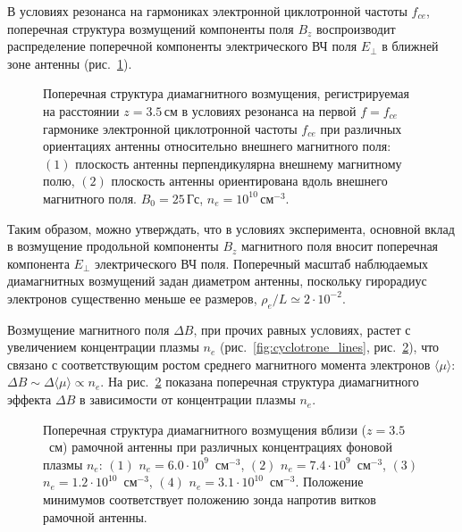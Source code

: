 \documentclass[autoref,10pt]{disser}
\begin{document}
В условиях резонанса на гармониках электронной циклотронной частоты $f_{ce}$, поперечная структура возмущений компоненты поля $B_{z}$  воспроизводит распределение поперечной компоненты электрического ВЧ поля $E_{\perp}$ в ближней зоне антенны (\mbox{рис.~\ref{fig:tr+par_distr}}).
\begin{figure}[H]
    \centering
    \def\svgwidth{0.6\columnwidth} %
    
    \caption{Поперечная структура диамагнитного возмущения, регистрируемая на расстоянии $z=3.5$\,см в условиях резонанса на первой $f=f_{ce}$ гармонике электронной циклотронной частоты $f_{ce}$ при различных ориентациях антенны относительно внешнего магнитного поля: $(1)$ плоскость антенны перпендикулярна внешнему магнитному полю, $(2)$ плоскость антенны ориентирована вдоль внешнего магнитного поля. $B_{0}=25$\,Гс, $n_{e}=10^{10}$\,см$^{-3}$.}
    \label{fig:tr+par_distr}
\end{figure}

Таким образом, можно утверждать, что в условиях эксперимента, основной вклад в возмущение продольной компоненты  $B_{z}$ магнитного поля вносит поперечная компонента $E_{\perp}$ электрического ВЧ поля. Поперечный масштаб наблюдаемых диамагнитных возмущений задан диаметром антенны, поскольку гирорадиус электронов существенно меньше ее размеров, $\rho_e/L \simeq2\cdot 10^{-2}$. 

Возмущение магнитного поля $\Delta{}B$, при прочих равных условиях, растет с увеличением концентрации плазмы $n_{e}$ (\mbox{рис.~\ref{fig:cyclotrone_lines}}, \mbox{рис.~\ref{fig:ne_distr}}), что связано с соответствующим ростом среднего магнитного момента электронов $\langle{}\mu{}\rangle$: $\Delta{}B\sim{}\Delta{}\langle{}\mu{}\rangle{}\propto{}n_{e}$.
На \mbox{рис.~\ref{fig:ne_distr}} показана поперечная структура диамагнитного эффекта $\Delta{}B$ в зависимости от концентрации плазмы $n_{e}$. 
\begin{figure}[H]
   \centering
   \def\svgwidth{0.5\columnwidth} %
   
   \vspace{0.5cm}
   \caption{Поперечная структура диамагнитного возмущения вблизи ($z=3.5$~см) рамочной антенны при различных концентрациях фоновой плазмы $n_{e}$: $(1)$ $n_{e}=6.0\cdot{}10^{9}$~см$^{-3}$, $(2)$ $n_{e}=7.4\cdot{}10^{9}$~см$^{-3}$, $(3)$  $n_{e}=1.2\cdot{}10^{10}$~см$^{-3}$, $(4)$ $n_{e}=3.1\cdot{}10^{10}$~см$^{-3}$. Положение минимумов соответствует положению зонда напротив витков рамочной антенны.}
   \label{fig:ne_distr}
\end{figure}
\end{document}
